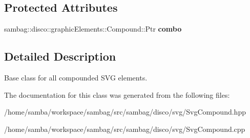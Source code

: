 \subsection*{Protected Attributes}
\begin{DoxyCompactItemize}
\item 
\hypertarget{classsambag_1_1disco_1_1svg_1_1_svg_compound_a72cd5fb9db21515519ddf9fb8ae3f3e2}{
sambag::disco::graphicElements::Compound::Ptr {\bfseries combo}}
\label{classsambag_1_1disco_1_1svg_1_1_svg_compound_a72cd5fb9db21515519ddf9fb8ae3f3e2}

\end{DoxyCompactItemize}


\subsection{Detailed Description}
Base class for all compounded SVG elements. 

The documentation for this class was generated from the following files:\begin{DoxyCompactItemize}
\item 
/home/samba/workspace/sambag/src/sambag/disco/svg/SvgCompound.hpp\item 
/home/samba/workspace/sambag/src/sambag/disco/svg/SvgCompound.cpp\end{DoxyCompactItemize}
